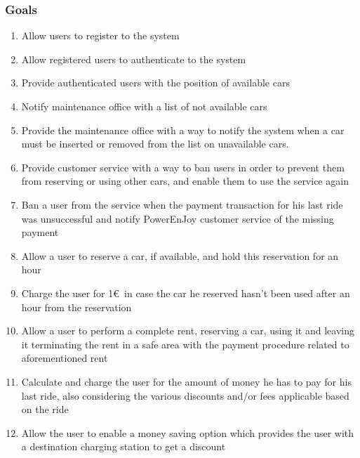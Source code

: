 	\subsubsection{Goals}
	\begin{enumerate}[label=\textbf{G\arabic*}]
		\item \label{goal:register} Allow users to register to the system
		\item \label{goal:login}Allow registered users to authenticate to the system
		\item \label{goal:position}Provide authenticated users with the position of available cars
		\item \label{goal:notifyMaintenance}Notify maintenance office with a list of not available cars 
		\item \label{goal:maintenance}Provide the maintenance office with a way to notify the system when a car must be inserted or removed from the list on unavailable cars.
		\item \label{goal:banUnbanUsers}Provide customer service with a way to ban users in order to prevent them from reserving or using other cars, and enable them to use the service again
		\item \label{goal:banPaymentFailed}Ban a user from the service when the payment transaction for his last ride was unsuccessful and notify PowerEnJoy customer service of the missing payment
		\item \label{goal:carReservation} Allow a user to reserve a car, if available, and hold this reservation for an hour
		\item \label{goal:reservationFee}Charge the user for 1\euro\ in case the car he reserved hasn't been used after an hour from the reservation
		\item \label{goal:completeRent}Allow a user to perform a complete rent, reserving a car, using it and leaving it terminating the rent in a safe area with the payment procedure related to aforementioned rent 
		\item \label{goal:calculateCost}Calculate and charge the user for the amount of money he has to pay for his last ride, also considering the various discounts and/or fees applicable based on the ride
		\item \label{goal:moneySavingOption}Allow the user to enable a money saving option which provides the user with a destination charging station to get a discount
	\end{enumerate}

